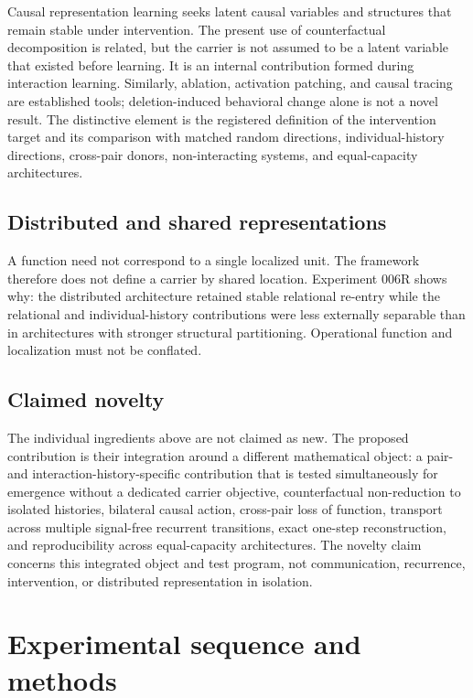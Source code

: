 \documentclass[11pt,a4paper]{article}
\begin{document}
Causal representation learning seeks latent causal variables and structures that remain stable under intervention. The present use of counterfactual decomposition is related, but the carrier is not assumed to be a latent variable that existed before learning. It is an internal contribution formed during interaction learning. Similarly, ablation, activation patching, and causal tracing are established tools; deletion-induced behavioral change alone is not a novel result. The distinctive element is the registered definition of the intervention target and its comparison with matched random directions, individual-history directions, cross-pair donors, non-interacting systems, and equal-capacity architectures.

\subsection{Distributed and shared representations}

A function need not correspond to a single localized unit. The framework therefore does not define a carrier by shared location. Experiment 006R shows why: the distributed architecture retained stable relational re-entry while the relational and individual-history contributions were less externally separable than in architectures with stronger structural partitioning. Operational function and localization must not be conflated.

\subsection{Claimed novelty}

The individual ingredients above are not claimed as new. The proposed contribution is their integration around a different mathematical object: a pair- and interaction-history-specific contribution that is tested simultaneously for emergence without a dedicated carrier objective, counterfactual non-reduction to isolated histories, bilateral causal action, cross-pair loss of function, transport across multiple signal-free recurrent transitions, exact one-step reconstruction, and reproducibility across equal-capacity architectures. The novelty claim concerns this integrated object and test program, not communication, recurrence, intervention, or distributed representation in isolation.

\section{Experimental sequence and methods}
\end{document}
